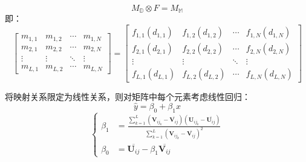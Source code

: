 \documentclass[10pt]{beamer}
\begin{document}
\begin{frame}
    \begin{equation}
        M_{\mathbb{D}} \otimes F = M_{\mathbb{M}}
    \end{equation}
    即：
    \begin{equation}
        \begin{bmatrix}
            m_{1,1} & m_{1,2} & \cdots & m_{1,N} \\
            m_{2,1} & m_{2,2} & \cdots & m_{2,N} \\
            \vdots & \vdots & \ddots & \vdots \\
            m_{L,1} & m_{L,2} & \cdots & m_{L,N}
        \end{bmatrix}=\begin{bmatrix}
            f_{1,1}(d_{1,1}) & f_{1,2}(d_{1,2}) & \cdots & f_{1,N}(d_{1,N}) \\
            f_{2,1}(d_{2,1}) & f_{2,2}(d_{2,2}) & \cdots & f_{2,N}(d_{2,N}) \\
            \vdots & \vdots & \ddots & \vdots \\
            f_{L,1}(d_{L,1}) & f_{L,2}(d_{L,2}) & \cdots & f_{L,N}(d_{L,N})
        \end{bmatrix}
    \end{equation}
\end{frame}
\begin{frame}
    将映射关系限定为线性关系，则对矩阵中每个元素考虑线性回归：
    \begin{equation}
        \hat{y} = \beta_0 + \beta_1 x
    \end{equation}
    \begin{equation}
        \left\{ 
        \begin{aligned}
               \beta_1 &= \frac{\sum_{k=1}^{L} (\mathbf{V}_{{ij}_k}-\overline{\mathbf{V}_{ij}}) (\mathbf{U}_{{ij}_k}-\overline{\mathbf{U}_{ij}})}{\sum_{k=1}^{L} (\mathbf{V}_{{ij}_k}-\overline{\mathbf{V}_{ij}})^2}\\
            \beta_0 &= \overline{\mathbf{U}_{ij}}-\beta_1 \overline{\mathbf{V}_{ij}}
        \end{aligned}
        \right.
    \end{equation}
\end{frame}
\end{document}
